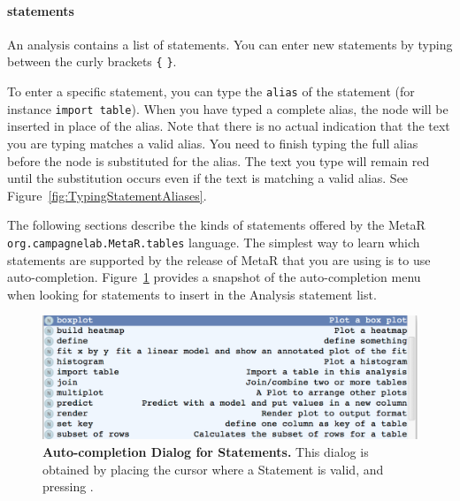 \paragraph{statements}
An analysis contains a list of statements. You can enter new statements by typing between the curly brackets \texttt{\{} \texttt{\}}. 

To enter a specific statement, you can type the \texttt{alias} of the statement (for instance \texttt{import table}). When you have typed a complete alias, the node will be inserted in place of the alias. Note that there is no actual indication that the text you are typing matches a valid alias. You need to finish typing the full alias before the node is substituted for the alias. The text you type will remain red until the substitution occurs even if the text is matching a valid alias. See Figure~\ref{fig:TypingStatementAliases}.

\noindent The following sections describe the kinds of statements offered by the MetaR \texttt{org\allowbreak.campagne\allowbreak{}lab\allowbreak.MetaR\allowbreak.tables} language. The simplest way to learn which statements are supported by the release of MetaR that you are using is to use auto-completion. Figure~\ref{fig:AutoCompletionForStatements} provides a snapshot of the auto-completion menu when looking for statements to insert in the Analysis statement list. 

\begin{figure}[h!tbp]
  \centering
  \includegraphics[width=\figWidthWide]{figures/StatementAuto-completion.png}
\caption[Auto-completion Dialog for Statements.]{\textbf{Auto-completion Dialog for Statements.} This dialog is obtained by placing the cursor where a Statement is valid, and pressing \keys{\ctrl+\space}.}
\label{fig:AutoCompletionForStatements}
\end{figure}



